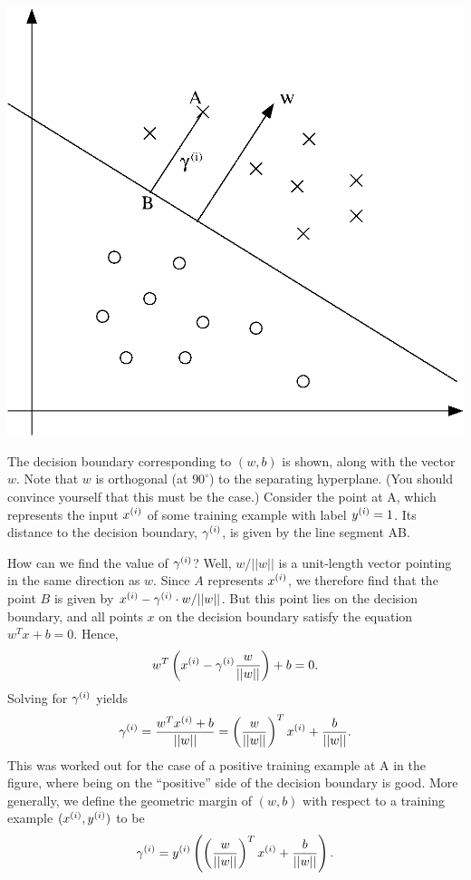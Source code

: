 \documentclass{article}
\begin{document}
\begin{center}
\includegraphics[scale=0.5]{geometricMargin2.eps}
\end{center}

The decision boundary corresponding to $(w,b)$ is shown, along with the vector $w$.  Note
that $w$ is orthogonal (at $90^\circ$) to the separating hyperplane.  (You should convince yourself
that this must be the case.)  Consider the point at A, which represents the input ${x^{(i)}}$ of some
training example with label ${y^{(i)}}=1$.  Its distance to the decision boundary, ${\gamma^{(i)}}$, is given
by the line segment AB.

How can we find the value of ${\gamma^{(i)}}$?  Well, $w/||w||$ is a unit-length vector pointing in the same
direction as $w$.
Since $A$ represents ${x^{(i)}}$, we therefore find that the
point $B$ is given by ${x^{(i)}} - {\gamma^{(i)}} \cdot w/||w||$.  But this point
lies on the decision boundary, and all points $x$ on the decision boundary satisfy the equation
$w^Tx + b = 0$.  Hence,
\[
w^T\left({x^{(i)}} - {\gamma^{(i)}} \frac{w}{||w||}\right) + b = 0.
\]
Solving for ${\gamma^{(i)}}$ yields
\[
{\gamma^{(i)}} = \frac{w^T{x^{(i)}} + b}{||w||} = \left(\frac{w}{||w||}\right)^T{x^{(i)}} + \frac{b}{||w||}.
\]
This was worked out for the case of a positive training example at A in the figure, where being
on the ``positive'' side of the decision boundary is good.  More generally, we define the geometric
margin of $(w,b)$ with respect to a training example $({x^{(i)}}, {y^{(i)}})$ to be
\[
{\gamma^{(i)}} = {y^{(i)}} \left( \left(\frac{w}{||w||}\right)^T{x^{(i)}} + \frac{b}{||w||} \right).
\]
\end{document}
